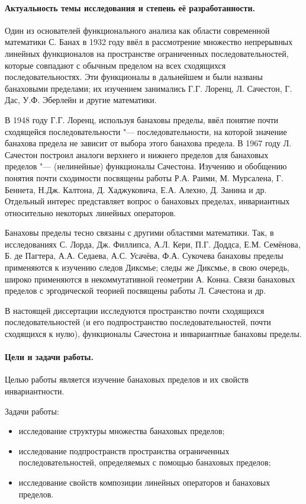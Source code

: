 \paragraph{Актуальность темы исследования и степень её разработанности.}

Один из основателей функционального анализа как области современной математики С. Банах
в 1932 году ввёл в рассмотрение множество непрерывных линейных функционалов на пространстве ограниченных последовательностей,
которые совпадают с обычным пределом на всех сходящихся последовательностях.
Эти функционалы в дальнейшем и были названы банаховыми пределами;
их изучением занимались Г.Г. Лоренц, Л. Сачестон, Г. Дас, У.Ф. Эберлейн и другие математики.

В 1948 году Г.Г. Лоренц, используя банаховы пределы, ввёл понятие почти сходящейся последовательности "---
последовательности, на которой значение банахова предела не зависит от выбора этого банахова предела.
В 1967 году Л. Сачестон построил аналоги верхнего и нижнего пределов для банаховых пределов "---
(нелинейные) функционалы Сачестона.
Изучению и обобщению понятия почти сходимости посвящены работы
Р.А. Раими, М. Мурсалена, Г. Беннета, Н.Дж. Калтона, Д. Хаджуковича, Е.А. Алехно, Д. Занина и др.
Отдельный интерес представляет вопрос о банаховых пределах, инвариантных относительно некоторых линейных операторов.

Банаховы пределы тесно связаны с другими областями математики.
Так, в исследованиях С. Лорда, Дж. Филлипса, А.Л. Кери, П.Г. Доддса, Е.М. Семёнова, Б. де Пагтера,
А.А. Седаева, А.С. Усачёва, Ф.А. Сукочева банаховы пределы применяются к изучению следов Диксмье;
следы же Диксмье, в свою очередь, широко применяются в некоммутативной геометрии А. Конна.
Связи банаховых пределов с эргодической теорией посвящены работы Л. Сачестона и др.

В настоящей диссертации исследуются пространство почти сходящихся последовательностей
(и его подпространство последовательностей, почти сходящихся к нулю),
функционалы Сачестона и инвариантные банаховы пределы.

\paragraph{Цели и задачи работы.}
Целью работы является изучение банаховых пределов и их свойств инвариантности.

Задачи работы:
\begin{itemize}
	\item
		исследование структуры множества банаховых пределов;
	\item
		исследование подпространств пространства ограниченных последовательностей,
		определяемых с помощью банаховых пределов;
	\item
		исследование свойств композиции линейных операторов и банаховых пределов.
\end{itemize}


